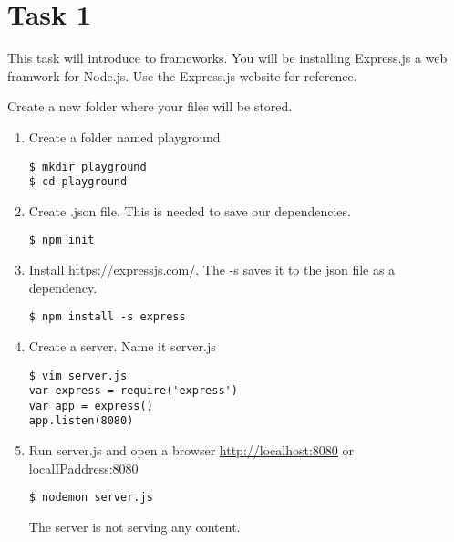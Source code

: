 \documentclass[12pt]{article}
\begin{document}
\section*{Task 1}
This task will introduce to frameworks. You will be installing Express.js a web framwork for Node.js. Use the Express.js website for reference.
\begin{todolist}
    \item Create a new folder where your files will be stored. 
\begin{enumerate}
    \item Create a folder named playground 
\begin{lstlisting}
$ mkdir playground 
$ cd playground 
\end{lstlisting}
    \item Create .json file. This is needed to save our dependencies. 
\begin{lstlisting}
$ npm init 
\end{lstlisting}
    \item Install \href{https://expressjs.com/}{https://expressjs.com/}. The -s saves it to the json file as a dependency. 
\begin{lstlisting}
$ npm install -s express 
\end{lstlisting}
    \item Create a server. Name it server.js 
\begin{lstlisting}
$ vim server.js 
var express = require('express')
var app = express()
app.listen(8080)
\end{lstlisting} 
    \item Run server.js and open a browser \href{http://localhost/}{http://localhost:8080} or localIPaddress:8080

\begin{lstlisting}
$ nodemon server.js 
\end{lstlisting}
The server is not serving any content. 
\end{enumerate}
    \end{todolist}
\end{document}
